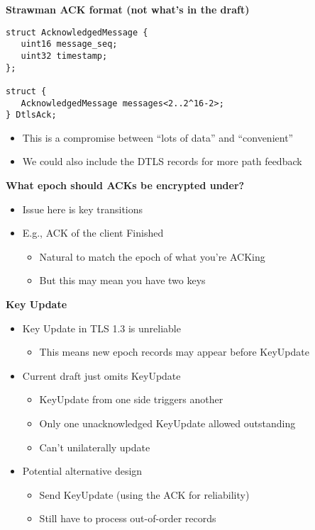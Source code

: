 \documentclass[helvetica]{seminar}
\newcommand{\heading}[1]{%
  \begin{center} 
    \large\bf 
    #1 
  \end{center} 
  \vspace{.4 in}}
\begin{document}
\begin{slide}
\heading{Strawman ACK format (not what's in the draft)}

{\small
\begin{verbatim}
struct AcknowledgedMessage {
   uint16 message_seq;
   uint32 timestamp; 
};

struct {
   AcknowledgedMessage messages<2..2^16-2>;
} DtlsAck;
\end{verbatim}
}

\begin{itemize}
\item This is a compromise between ``lots of data'' and ``convenient''
\item We could also include the DTLS records for more path feedback
\end{itemize}

\end{slide}

\begin{slide}
\heading{What epoch should ACKs be encrypted under?}

\begin{itemize}
\item Issue here is key transitions
\item E.g., ACK of the client Finished
  \begin{itemize}
  \item Natural to match the epoch of what you're ACKing
  \item But this may mean you have two keys
  \end{itemize}
\end{itemize}
\end{slide}

\begin{slide}
\heading{Key Update}

\begin{itemize}
\item Key Update in TLS 1.3 is unreliable
  \begin{itemize}
  \item This means new epoch records may appear before KeyUpdate
  \end{itemize}
\item Current draft just omits KeyUpdate
  \begin{itemize}
  \item KeyUpdate from one side triggers another
  \item Only one unacknowledged KeyUpdate allowed outstanding
  \item Can't unilaterally update
  \end{itemize}

\item Potential alternative design
  \begin{itemize}
  \item Send KeyUpdate (using the ACK for reliability)
  \item Still have to process out-of-order records
  \end{itemize}
\end{itemize}
\end{slide}
\end{document}
